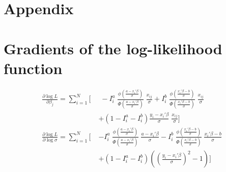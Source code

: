 \documentclass[article,nojss]{jss}
\newcommand{\dnorm}{\phi}%
\newcommand{\pnorm}{\Phi}%
\begin{document}
\clearpage
\appendix
\section*{Appendix}

\section{Gradients of the log-likelihood function}
\label{sec:logLikGrad}
\begin{align}
\frac{ \partial \log L }{ \partial \beta_j } =
   \sum_{i = 1}^N \Bigg[ &\;
      - I_i^a \;
         \frac{ \dnorm \left( \frac{ a - x_i ' \beta }{ \sigma } \right) }
            { \pnorm \left( \frac{ a - x_i ' \beta }{ \sigma } \right) }
         \; \frac{ x_{ij} }{ \sigma }
      + I_i^b \;
         \frac{ \dnorm \left( \frac{ x_i ' \beta - b }{ \sigma } \right) }
            { \pnorm \left( \frac{ x_i ' \beta - b }{ \sigma } \right) }
         \; \frac{ x_{ij} }{ \sigma } \\
   & + \left( 1 - I_i^a - I_i^b \right)
      \frac{ y_i - x_i ' \beta }{ \sigma }
      \; \frac{ x_{ij} }{ \sigma }
      \Bigg] \nonumber\\
\frac{ \partial \log L }{ \partial \log \sigma } =
   \sum_{i = 1}^N \Bigg[ \;&
      - I_i^a \;
         \frac{ \dnorm \left( \frac{ a - x_i ' \beta }{ \sigma } \right) }
            { \pnorm \left( \frac{ a - x_i ' \beta }{ \sigma } \right) }
         \; \frac{ a - x_i ' \beta }{ \sigma }
      - I_i^b \;
         \frac{ \dnorm \left( \frac{ x_i ' \beta - b }{ \sigma } \right) }
            { \pnorm \left( \frac{ x_i ' \beta - b }{ \sigma } \right) }
         \; \frac{ x_i ' \beta - b }{ \sigma } \\
   & + \left( 1 - I_i^a - I_i^b \right)
      \left(
         \left( \frac{ y_i - x_i ' \beta }{ \sigma } \right)^2
         - 1
      \right)
      \Bigg] \nonumber
\end{align}



% 
\end{document}
